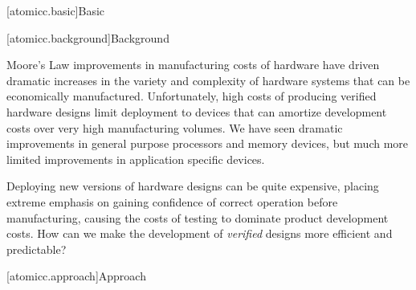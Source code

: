 [atomicc.basic]{Basic}

[atomicc.background]{Background}

Moore's Law improvements in manufacturing
costs of hardware have driven dramatic increases in the variety and complexity
of hardware systems that can be economically manufactured.
Unfortunately, high costs of producing verified hardware designs limit
deployment to devices that
can amortize development costs over very high manufacturing volumes.
We have seen dramatic improvements in general purpose processors
and memory devices, but much more limited improvements in application
specific devices.

Deploying new versions of hardware designs can be quite expensive,
placing extreme emphasis on gaining confidence of correct operation before
manufacturing, causing the costs of testing to
dominate product development costs.
How can we make the development of 
\textit{verified} designs more efficient and predictable?

[atomicc.approach]{Approach}

